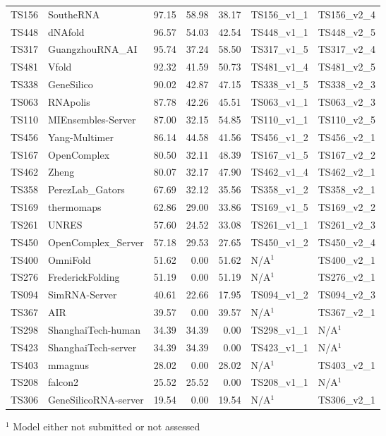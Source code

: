 \begin{table}[ht]
{\begin{tabular}{llrrrll}
TS156 & SoutheRNA & 97.15 & 58.98 & 38.17 & TS156\_v1\_1 & TS156\_v2\_4 \\ 
TS448 & dNAfold & 96.57 & 54.03 & 42.54 & TS448\_v1\_1 & TS448\_v2\_5 \\ 
TS317 & GuangzhouRNA\_AI & 95.74 & 37.24 & 58.50 & TS317\_v1\_5 & TS317\_v2\_4 \\ 
TS481 & Vfold & 92.32 & 41.59 & 50.73 & TS481\_v1\_4 & TS481\_v2\_5 \\ 
TS338 & GeneSilico & 90.02 & 42.87 & 47.15 & TS338\_v1\_5 & TS338\_v2\_3 \\ 
TS063 & RNApolis & 87.78 & 42.26 & 45.51 & TS063\_v1\_1 & TS063\_v2\_3 \\ 
TS110 & MIEnsembles-Server & 87.00 & 32.15 & 54.85 & TS110\_v1\_1 & TS110\_v2\_5 \\ 
TS456 & Yang-Multimer & 86.14 & 44.58 & 41.56 & TS456\_v1\_2 & TS456\_v2\_1 \\ 
TS167 & OpenComplex & 80.50 & 32.11 & 48.39 & TS167\_v1\_5 & TS167\_v2\_2 \\ 
TS462 & Zheng & 80.07 & 32.17 & 47.90 & TS462\_v1\_4 & TS462\_v2\_1 \\ 
TS358 & PerezLab\_Gators & 67.69 & 32.12 & 35.56 & TS358\_v1\_2 & TS358\_v2\_1 \\ 
TS169 & thermomaps & 62.86 & 29.00 & 33.86 & TS169\_v1\_5 & TS169\_v2\_2 \\ 
TS261 & UNRES & 57.60 & 24.52 & 33.08 & TS261\_v1\_1 & TS261\_v2\_3 \\ 
TS450 & OpenComplex\_Server & 57.18 & 29.53 & 27.65 & TS450\_v1\_2 & TS450\_v2\_4 \\ 
TS400 & OmniFold & 51.62 & 0.00 & 51.62 & N/A$^{1}$ & TS400\_v2\_1 \\ 
TS276 & FrederickFolding & 51.19 & 0.00 & 51.19 & N/A$^{1}$ & TS276\_v2\_1 \\ 
TS094 & SimRNA-Server & 40.61 & 22.66 & 17.95 & TS094\_v1\_2 & TS094\_v2\_3 \\ 
TS367 & AIR & 39.57 & 0.00 & 39.57 & N/A$^{1}$ & TS367\_v2\_1 \\ 
TS298 & ShanghaiTech-human & 34.39 & 34.39 & 0.00 & TS298\_v1\_1 & N/A$^{1}$ \\ 
TS423 & ShanghaiTech-server & 34.39 & 34.39 & 0.00 & TS423\_v1\_1 & N/A$^{1}$ \\ 
TS403 & mmagnus & 28.02 & 0.00 & 28.02 & N/A$^{1}$ & TS403\_v2\_1 \\ 
TS208 & falcon2 & 25.52 & 25.52 & 0.00 & TS208\_v1\_1 & N/A$^{1}$ \\ 
TS306 & GeneSilicoRNA-server & 19.54 & 0.00 & 19.54 & N/A$^{1}$ & TS306\_v2\_1 \\ 
\bottomrule
\end{tabular}%
}
\begin{flushleft}\footnotesize $^{1}$ Model either not submitted or not assessed\end{flushleft}
\end{table}
